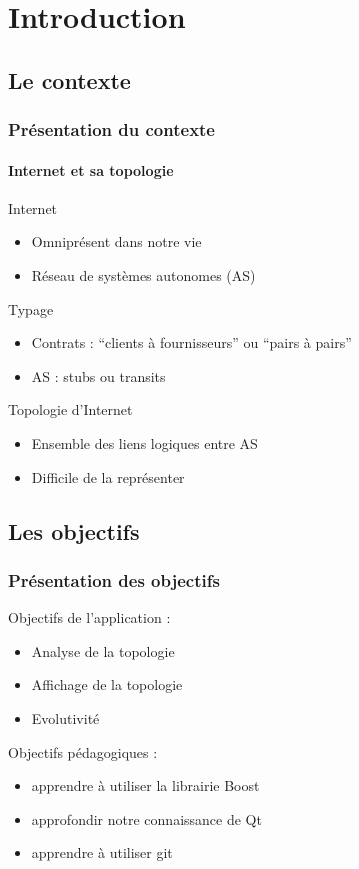 \section*{Introduction}

\subsection*{Le contexte}
\frame
{
\frametitle{Pr\'esentation du contexte}
\framesubtitle{Internet et sa topologie}
\vfill
\begin{block}{Internet}
\begin{itemize}
\item Omnipr\'esent dans notre vie
\item  R\'eseau de systèmes autonomes (AS)
\end{itemize}
\end{block}
\vfill
\begin{block}{Typage}
\begin{itemize}
\item Contrats : ``clients à fournisseurs'' ou ``pairs à pairs''
\item AS : stubs ou transits
\end{itemize}
\end{block}
\vfill
\begin{block}{Topologie d'Internet}
\begin{itemize}
\item Ensemble des liens logiques entre AS
\item Difficile de la repr\'esenter
\end{itemize}
\end{block}
\vfill
}

\subsection*{Les objectifs}
\frame
{
\frametitle{Pr\'esentation des objectifs}
Objectifs de l'application :
\begin{itemize}
 \item Analyse de la topologie
 \item Affichage de la topologie
 \item Evolutivit\'e
\end{itemize}

Objectifs p\'edagogiques :
\begin{itemize}
 \item apprendre \`a utiliser la librairie Boost
 \item approfondir notre connaissance de Qt
 \item apprendre \`a utiliser git
\end{itemize}

}
